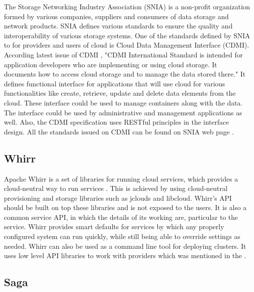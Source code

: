      The Storage Networking Industry Association (SNIA)
     \cite{www-sniawebsite} is a non-profit organization formed by
     various companies, suppliers and consumers of data storage and
     network products. SNIA defines various standards to ensure the
     quality and interoperability of various storage systems. One of
     the standards defined by SNIA to for providers and users of cloud
     is Cloud Data Management Interface (CDMI). According latest issue
     of CDMI \cite{cdmi-manual}, "CDMI International Standard is
     intended for application developers who are implementing or using
     cloud storage. It documents how to access cloud storage and to
     manage the data stored there." It defines functional interface
     for applications that will use cloud for various functionalities
     like create, retrieve, update and delete data elements from the
     cloud. These interface could be used to manage containers along
     with the data. The interface could be used by administrative and
     management applications as well. Also, the CDMI specification
     uses RESTful principles in the interface design. All the
     standards issued on CDMI can be found on SNIA web page
     \cite{www-cdmiwebsite}.
     
\subsection{Whirr}
     
     Apache Whirr is a set of libraries for running cloud services,
     which provides a cloud-neutral way to run services
     \cite{www-ApacheWhirr}. This is achieved by using cloud-neutral
     provisioning and storage libraries such as jclouds and
     libcloud. Whirr's API should be built on top these libraries and
     is not exposed to the users. It is also a common service API, in
     which the details of its working are, particular to the service.
     Whirr provides smart defaults for services by which any properly
     configured system can run quickly, while still being able to
     override settings as needed. Whirr can also be used as a command
     line tool for deploying clusters. It uses low level API libraries
     to work with providers which was mentioned in the
     \cite{www-slideshare-ApacheWhirr}.

     
\subsection{Saga}

